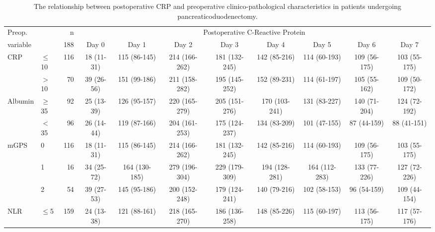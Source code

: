 \begin{sidewaystable}[p]
	\caption{The relationship  between postoperative CRP and preoperative clinico-pathological characteristics in patients undergoing pancreaticoduodenectomy. }
	\label{table:sirs_crp}
	\footnotesize
	\centering
	\renewcommand{\arraystretch}{1.2} %

	\begin{tabular}{|llr | cccccccc|}
		\hline
		Preop.              &           &   n &                                   \multicolumn{8}{c|}{Postoperative C-Reactive Protein}                                   \\
		variable            &           & 188 & Day 0      &     Day 1     &     Day 2     &     Day 3     &     Day 4     &     Day 5     &    Day 6     &     Day 7     \\ \hline
		CRP                 & $\leq$10  & 116 & 18 (11-31) & 115 (86-145)  & 214 (166-262) & 181 (132-245) & 142 (85-216)  & 114 (60-193)  & 109 (56-175) & 103 (55-175)  \\
		                    & $>$10     &  70 & 39 (26-56) & 151 (99-186)  & 211 (158-282) & 195 (145-252) & 152 (89-231)  & 114 (61-197)  & 105 (55-162) & 109 (50-172)  \\
		Albumin             & $\geq$35  &  92 & 25 (13-39) & 126 (95-157)  & 220 (165-279) & 205 (151-276) & 170 (103-241) & 131 (83-227)  & 140 (71-204) & 124 (72-192)  \\
		                    & $<$35     &  96 & 26 (14-44) & 119 (87-166)  & 204 (161-253) & 175 (124-237) & 134 (83-209)  & 101 (47-155)  & 87 (44-159)  &  88 (41-151)  \\
		mGPS                & 0         & 116 & 18 (11-31) & 115 (86-145)  & 214 (166-262) & 181 (132-245) & 142 (85-216)  & 114 (60-193)  & 109 (56-175) & 103 (55-175)  \\
		                    & 1         &  16 & 34 (25-72) & 164 (130-185) & 279 (196-304) & 229 (179-309) & 194 (128-281) & 164 (112-283) & 133 (77-226) & 127 (72-226)  \\
		                    & 2         &  54 & 39 (27-53) & 145 (95-186)  & 200 (152-248) & 179 (124-241) & 140 (79-216)  & 102 (58-153)  & 96 (54-159)  & 109 (44-154)  \\
		NLR                 & $\leq$5   & 159 & 24 (13-38) & 121 (88-161)  & 218 (165-270) & 186 (136-258) & 148 (85-226)  & 115 (60-197)  & 113 (56-175) & 117 (57-176)  \\

\end{tabular}
\end{sidewaystable}
